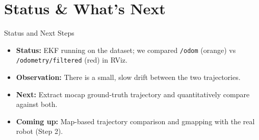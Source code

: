 \documentclass[10pt]{beamer}
\begin{document}



\section{Status \& What’s Next}

\begin{frame}{Status and Next Steps}
\begin{itemize}
    \item \textbf{Status:} EKF running on the dataset; we compared \texttt{/odom} (orange) vs \texttt{/odometry/filtered} (red) in RViz.
    \item \textbf{Observation:} There is a small, slow drift between the two trajectories.
    \item \textbf{Next:} Extract mocap ground-truth trajectory and quantitatively compare against both.
    \item \textbf{Coming up:} Map-based trajectory comparison and gmapping with the real robot (Step 2).
\end{itemize}
\end{frame}

\end{document}
